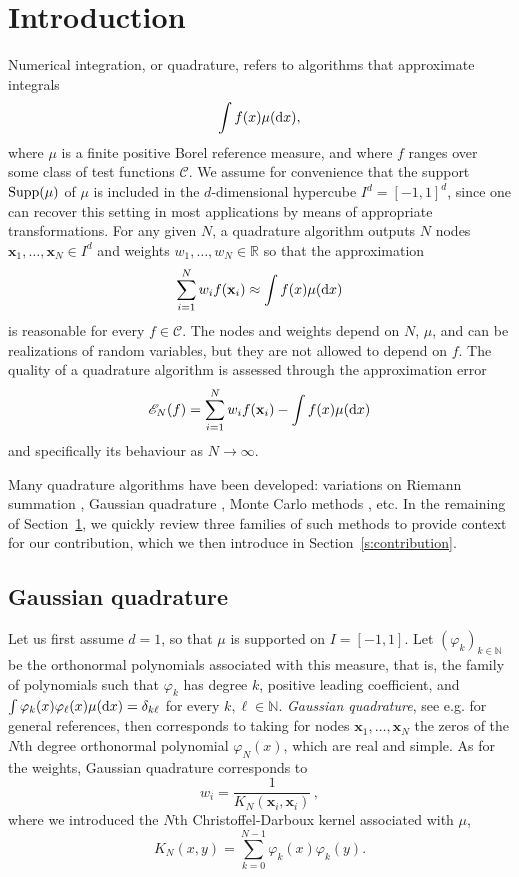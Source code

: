 \documentclass[a4paper,11pt]{article}
\numberwithin{equation}{section}
\theoremstyle{definition}
\newcommand{\eq}{\begin{equation}}
\newcommand{\qe}{\end{equation}}
\newcommand{\N}{\mathbb{N}}
\newcommand{\R}{\mathbb{R}}
\newcommand{\Supp}{{\rm Supp}}
\newcommand{\bv}{\mathbf}
\renewcommand{\phi}{\varphi}
\renewcommand{\d}{ {\rm d}}
\def\eqsp{\,}
\begin{document}
\section{Introduction}
\label{s:intro}
Numerical integration, or quadrature, refers to algorithms that approximate integrals
\eq
\label{int f mu}
\int f(x)\mu(\d x),
\qe
where $\mu$ is a finite positive Borel reference measure, and where $f$ ranges
over some class of test functions $\mathscr C$. We assume for convenience that
the support $\Supp(\mu)$ of $\mu$ is included in the $d$-dimensional hypercube $I^d=[-1,1]^d$, since one
can recover this setting in most applications by means of appropriate
transformations. For any given $N$, a quadrature algorithm outputs $N$ nodes $\bv x_1,\ldots,\bv x_N\in I^d$ and weights $w_1,\ldots,w_N\in\R$ so that the approximation
\eq
\label{e:quadrature}
\sum_{i=1}^N w_i f(\bv x_i) \approx \int f(x)\mu(\d x)
\qe
is reasonable for every $f\in\mathscr C$. The nodes and weights depend on $N$, $\mu$,
and can be realizations of random variables, but they are not allowed to depend
on $f$. The quality of a quadrature algorithm is assessed through the
approximation error
\eq
\mathscr E_N(f)= \sum_{i=1}^N w_i f(\bv x_i)-\int f(x)\mu(\d x)
\label{e:error}
\qe
and specifically its behaviour as $N\to\infty$.


 Many quadrature algorithms have been
developed: variations on Riemann summation \citep{DaRa84}, Gaussian quadrature
\citep{Gau04}, Monte Carlo methods \citep{RoCa04}, etc. In the remaining of
Section~\ref{s:intro}, we quickly review three families of such methods to
provide context for our contribution, which we then introduce in
Section~\ref{s:contribution}.

\subsection{Gaussian quadrature}
\label{s:quadrature}
Let us first assume $d=1$, so that $\mu$ is supported on $I=[-1,1]$. Let
$(\phi_k)_{k\in\N}$ be the orthonormal polynomials associated with this measure,
that is, the family of polynomials such that $\phi_k$
has degree $k$, positive leading coefficient, and $\int
\phi_k(x)\phi_\ell(x)\mu(\d x)=\delta_{k\ell}$ for every $k,\ell\in\N$.
\emph{Gaussian quadrature}, see e.g. \citep{DaRa84,Gau04,BrPe11} for
general references, then corresponds to taking for nodes $\bv x_1,\ldots,\bv x_N$ the
zeros of the $N$th degree orthonormal polynomial $\phi_N(x)$, which are real and
simple. As for the weights, Gaussian quadrature corresponds to
\eq
\label{weight Gauss}
w_i = \frac{1}{K_N(\bv x_i, \bv x_i)}\eqsp,
\qe
where we introduced the $N$th Christoffel-Darboux kernel associated  with $\mu$,
\eq
\label{CD Gauss}
K_N(x,y)=\sum_{k=0}^{N-1}\phi_k(x)\phi_k(y).
\qe
\end{document}
